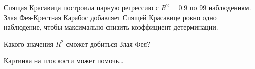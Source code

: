 
\begin{question}
Спящая Красавица построила парную регрессию с \(R^2=0.9\) по 99 наблюдениям.
Злая Фея-Крестная Карабос добавляет Спящей Красавице ровно одно наблюдение,
чтобы максимально снизить коэффициент детерминации.

Какого значения \(R^2\) сможет добиться Злая Фея?
\end{question}

\begin{solution}
Картинка на плоскости может помочь\ldots{}
\end{solution}

